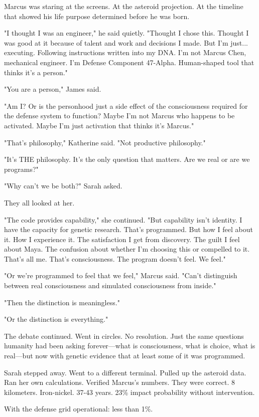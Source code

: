 Marcus was staring at the screens. At the asteroid projection. At the timeline that showed his life purpose determined before he was born.

"I thought I was an engineer," he said quietly. "Thought I chose this. Thought I was good at it because of talent and work and decisions I made. But I'm just... executing. Following instructions written into my DNA. I'm not Marcus Chen, mechanical engineer. I'm Defense Component 47-Alpha. Human-shaped tool that thinks it's a person."

"You are a person," James said.

"Am I? Or is the personhood just a side effect of the consciousness required for the defense system to function? Maybe I'm not Marcus who happens to be activated. Maybe I'm just activation that thinks it's Marcus."

"That's philosophy," Katherine said. "Not productive philosophy."

"It's THE philosophy. It's the only question that matters. Are we real or are we programs?"

"Why can't we be both?" Sarah asked.

They all looked at her.

"The code provides capability," she continued. "But capability isn't identity. I have the capacity for genetic research. That's programmed. But how I feel about it. How I experience it. The satisfaction I get from discovery. The guilt I feel about Maya. The confusion about whether I'm choosing this or compelled to it. That's all me. That's consciousness. The program doesn't feel. We feel."

"Or we're programmed to feel that we feel," Marcus said. "Can't distinguish between real consciousness and simulated consciousness from inside."

"Then the distinction is meaningless."

"Or the distinction is everything."

The debate continued. Went in circles. No resolution. Just the same questions humanity had been asking forever—what is consciousness, what is choice, what is real—but now with genetic evidence that at least some of it was programmed.

Sarah stepped away. Went to a different terminal. Pulled up the asteroid data. Ran her own calculations. Verified Marcus's numbers. They were correct. 8 kilometers. Iron-nickel. 37-43 years. 23\% impact probability without intervention.

With the defense grid operational: less than 1\%.

